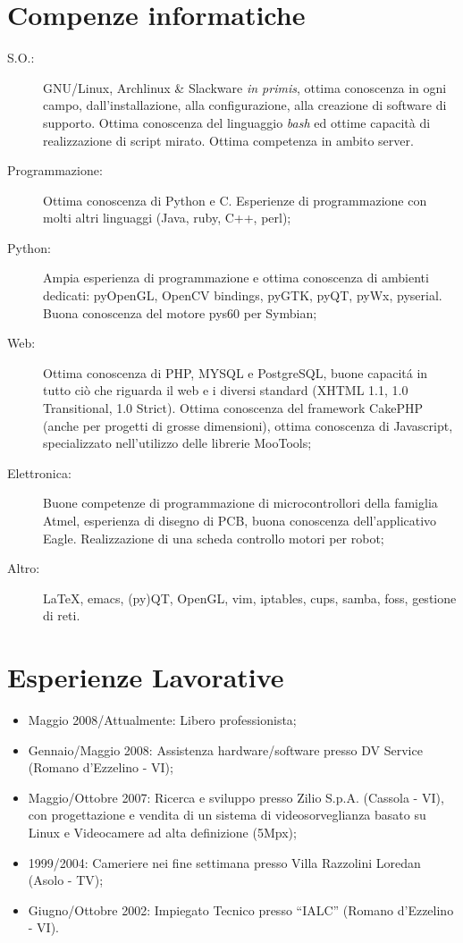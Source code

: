 \documentclass[pdftex, a4paper, 11pt]{article}
\begin{document}
\section*{Compenze informatiche}
\begin{description}
\item[S.O.:] GNU/Linux, Archlinux \& Slackware {\em in primis}, ottima conoscenza
  in ogni campo, dall'installazione, alla configurazione, alla
  creazione di software di supporto. Ottima conoscenza del linguaggio
  {\em bash} ed ottime capacit\`a di realizzazione di script
  mirato. Ottima competenza in ambito server.
\item[Programmazione:] Ottima conoscenza di Python e C. Esperienze di
  programmazione con molti altri linguaggi (Java,
  ruby, C++, perl);
\item[Python:] Ampia esperienza di programmazione e ottima conoscenza
  di ambienti dedicati: pyOpenGL, OpenCV bindings, pyGTK, pyQT, pyWx,
  pyserial. Buona conoscenza del motore pys60 per Symbian;
\item[Web:] Ottima conoscenza di PHP, MYSQL e PostgreSQL, buone capacit\'a in
  tutto ci\`o che riguarda il web e i diversi standard (XHTML 1.1,
  1.0 Transitional, 1.0 Strict). Ottima conoscenza del framework
  CakePHP (anche per progetti di grosse dimensioni), ottima conoscenza
  di Javascript, specializzato nell'utilizzo delle librerie MooTools;
\item[Elettronica:] Buone competenze di programmazione di
  microcontrollori della famiglia Atmel, esperienza di disegno di PCB,
  buona conoscenza dell'applicativo Eagle. Realizzazione di una scheda
  controllo motori per robot;
\item[Altro:] \LaTeX, emacs, (py)QT, OpenGL, vim, iptables, cups,
  samba, foss, gestione di reti.
\end{description}

\section*{Esperienze Lavorative}
\begin{itemize}
\item Maggio 2008/Attualmente: Libero professionista;
\item Gennaio/Maggio 2008: Assistenza hardware/software presso DV
  Service (Romano d'Ezzelino - VI);
\item Maggio/Ottobre 2007: Ricerca e sviluppo presso Zilio
  S.p.A. (Cassola - VI), con progettazione e vendita di un sistema di
  videosorveglianza basato su Linux e Videocamere ad alta definizione
  (5Mpx);
\item 1999/2004: Cameriere nei fine settimana presso Villa Razzolini
  Loredan (Asolo - TV);
\item Giugno/Ottobre 2002: Impiegato Tecnico presso ``IALC'' (Romano
  d'Ezzelino - VI).
\end{itemize}
\end{document}
